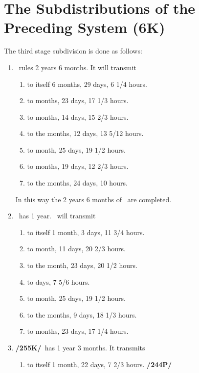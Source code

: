 \section{The Subdistributions of the Preceding System (6K)}

The third stage subdivision is done as follows:

\begin{enumerate}[label=\Roman*]
\item \Saturn\, rules 2 years 6 months. It will transmit
	\begin{enumerate}
		\item to itself 6 months, 29 days, 6 1/4 hours.
		\item to \Jupiter\xspace 2 months, 23 days, 17 1/3 hours.
		\item to \Mars\xspace 3 months, 14 days, 15 2/3 hours.
		\item to the \Sun\xspace 4 months, 12 days, 13 5/12 hours.
		\item to \Venus\xspace 1 month, 25 days, 19 1/2 hours.
		\item to \Mercury\xspace 4 months, 19 days, 12 2/3 hours.
		\item to the \Moon\xspace 5 months, 24 days, 10 hours. \\
	\end{enumerate}
	\vspace{-1em}
	In this way the 2 years 6 months of \Saturn\, are completed.
\item \Jupiter\, has 1 year. \Jupiter\, will transmit
	\begin{enumerate}
	\item to itself 1 month, 3 days, 11 3/4 hours.
	\item to \Mars\xspace 1 month, 11 days, 20 2/3 hours.
	\item to the \Sun\xspace 1 month, 23 days, 20 1/2 hours.
	\item to \Venus\xspace 22 days, 7 5/6 hours.
	\item to \Mercury\xspace 1 month, 25 days, 19 1/2 hours.
	\item to the \Moon\xspace 2 months, 9 days, 18 1/3 hours.
	\item to \Saturn\xspace 2 months, 23 days, 17 1/4 hours.
	\end{enumerate}
\item \textbf{/255K/}\Mars\, has 1 year 3 months. It transmits
	\begin{enumerate}
	\item to itself 1 month, 22 days, 7 2/3 hours. \textbf{/244P/}

\end{enumerate}
\end{enumerate}
